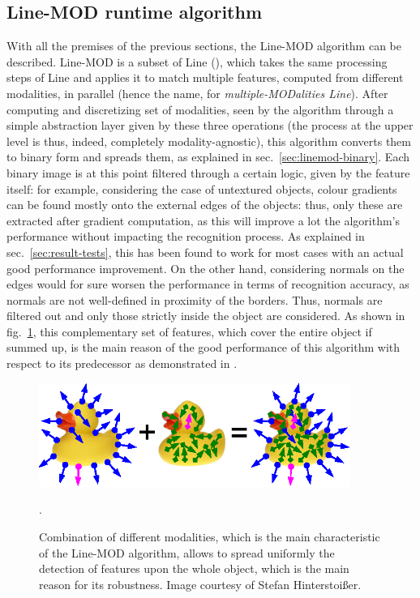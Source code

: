 \subsection{Line-MOD runtime algorithm} \label{sec:linemod-usage}
With all the premises of the previous sections, the Line-MOD algorithm
can be described. Line-MOD is a subset of Line
(\cite{linemod-origins}), which takes the same processing steps of
Line and applies it to match multiple features, computed from
different modalities, in parallel (hence the name, for
\emph{multiple-MODalities Line}). After computing and discretizing
set of modalities, seen by the algorithm through a simple abstraction
layer given by these three operations (the process at the upper level
is thus, indeed, completely modality-agnostic), this algorithm
converts them to binary form and spreads them, as explained in
sec.~\ref{sec:linemod-binary}. Each binary image is at this point filtered
through a certain logic, given by the feature itself: for example,
considering the case of untextured objects, colour gradients can be
found mostly onto the external edges of the objects: thus, only these
are extracted after gradient computation, as this will improve a lot
the algorithm's performance without impacting the recognition
process. As explained in sec.~\ref{sec:result-tests}, this has been
found to work for most cases with an actual good performance improvement.
On the other hand, considering normals on the edges would for sure
worsen the performance in terms of recognition accuracy, as normals
are not well-defined in proximity of the borders. Thus, normals are
filtered out and only those strictly inside the object are
considered. As shown in fig.~\ref{fig:duck-linemod}, this
complementary set of features, which cover the entire object if summed
up, is the main reason of the good performance of this algorithm with
respect to its predecessor as demonstrated in \cite{linemod-paper}.

\begin{figure}[htbp]
\centering
\includegraphics[width=4in]{./Graphics/duck-linemod}
\caption{Combination of different modalities, which is the main
  characteristic of the Line-MOD algorithm, allows to spread uniformly
  the detection of features upon the whole object, which is the main
  reason for its robustness. Image courtesy of Stefan Hinterstoi\ss er. \label{fig:duck-linemod}}.
\end{figure}

